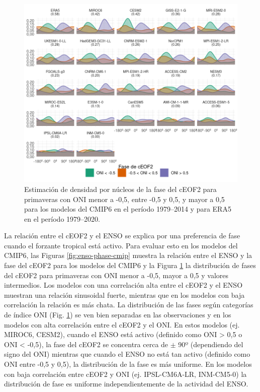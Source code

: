 \documentclass[12pt,oneside,a4paper]{reedthesis}
\begin{document}
\begin{figure}

{\centering \includegraphics{figures/50-cmip6/arg-enso-density-1} 

}

\caption{Estimación de densidad por núcleos de la fase del cEOF2 para primaveras con ONI menor a -0,5, entre -0,5 y 0,5, y mayor a 0,5 para los modelos del CMIP6 en el período 1979--2014 y para ERA5 en el período 1979--2020.}\label{fig:arg-enso-density}
\end{figure}



La relación entre el cEOF2 y el ENSO se explica por una preferencia de fase cuando el forzante tropical está activo.
Para evaluar esto en los modelos del CMIP6, las Figuras \ref{fig:enso-phase-cmip} muestra la relación entre el ENSO y la fase del cEOF2 para los modelos del CMIP6 y la Figura \ref{fig:arg-enso-density} la distribución de fases del cEOF2 para primaveras con ONI menor a -0,5, mayor a 0,5 y valores intermedios.
Los modelos con una correlación alta entre el cEOF2 y el ENSO muestran una relación sinusoidal fuerte, mientras que en los modelos con baja correlación la relación es más chata.
La distribución de las fases según categorías de índice ONI (Fig. \ref{fig:arg-enso-density}) se ven bien separadas en las observaciones y en los modelos con alta correlación entre el cEOF2 y el ONI.
En estos modelos (ej. MIROC6, CESM2), cuando el ENSO está activo (definido como ONI \textgreater{} 0,5 o ONI \textless{} -0,5), la fase del cEOF2 se concentra cerca de \(\pm\) 90º (dependiendo del signo del ONI) mientras que cuando el ENSO no está tan activo (definido como ONI entre -0,5 y 0,5), la distribución de la fase es más uniforme.
En los modelos con baja correlación entre cEOF2 y ONI (ej. IPSL-CM6A-LR, INM-CM5-0) la distribución de fase es uniforme independientemente de la actividad del ENSO.
\end{document}
